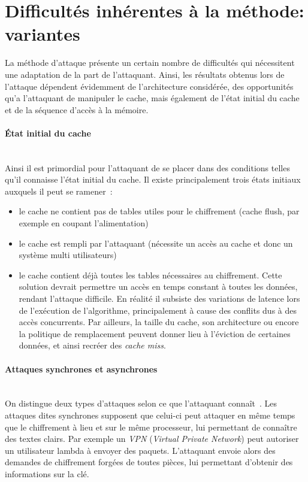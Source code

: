 \documentclass[a4paper,11pt]{article}
\begin{document}



\section{Difficultés inhérentes à la méthode: variantes}

La méthode d'attaque présente un certain nombre de difficultés qui nécessitent une adaptation de la part de l'attaquant. Ainsi, les résultats obtenus lors de l'attaque dépendent évidemment de l'architecture considérée, des opportunités qu'a l'attaquant de manipuler le cache, mais également de l'état initial du cache et de la séquence d'accès à la mémoire. 

\paragraph{État initial du cache} ~\\ 
Ainsi il est primordial pour l'attaquant de se placer dans des conditions telles qu'il connaisse l'état initial du cache. Il existe principalement trois états initiaux auxquels il peut se ramener~\cite{canteaut2006understanding}:
\begin{itemize}
\item le cache ne contient pas de tables utiles pour le chiffrement (cache flush, par exemple en coupant l'alimentation)
\item le cache est rempli par l'attaquant (nécessite un accès au cache et donc un système multi utilisateurs) 
\item le cache contient déjà toutes les tables nécessaires au chiffrement. Cette solution devrait permettre un accès en temps constant à toutes les données, rendant l'attaque difficile. En réalité il subsiste des variations de latence lors de l'exécution de l'algorithme, principalement à cause des conflits dus à des accès concurrents. Par ailleurs, la taille du cache, son architecture ou encore la politique de remplacement peuvent donner lieu à l'éviction de certaines données, et ainsi recréer des \emph{cache miss}.
\end{itemize}

\paragraph{Attaques synchrones et asynchrones} ~\\
On distingue deux types d'attaques selon ce que l'attaquant connaît~\cite{osvik2006cache}. Les attaques dites synchrones supposent que celui-ci peut attaquer en même temps que le chiffrement à lieu et sur le même processeur, lui permettant de connaître des textes clairs. Par exemple un \emph{VPN} (\emph{Virtual Private Network}) peut autoriser un utilisateur lambda à envoyer des paquets. L'attaquant envoie alors des demandes de chiffrement forgées de toutes pièces, lui permettant d'obtenir des informations sur la clé. 
\end{document}
